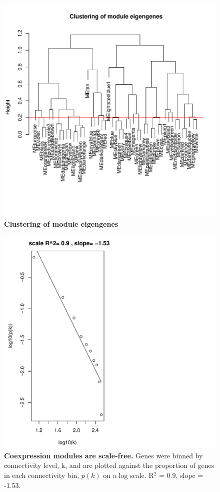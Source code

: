 \begin{figure}[ht!]
      \centering
       \includegraphics[width=\linewidth]{CapMergeLine}
    \caption{\textbf{Clustering of module eigengenes}}
    \label{fig:fsClust}
\end{figure}


\begin{figure}[ht!]
      \centering
       \includegraphics[width=\linewidth]{ScaleFree}
    \caption{\textbf{Coexpression modules are scale-free.} Genes were binned by connectivity level, k, and are plotted against the proportion of genes in each connectivity bin, $p(k)$ on a log scale. R$^{2}$ = 0.9, slope = -1.53.}
    \label{fig:fsScale}
\end{figure}


